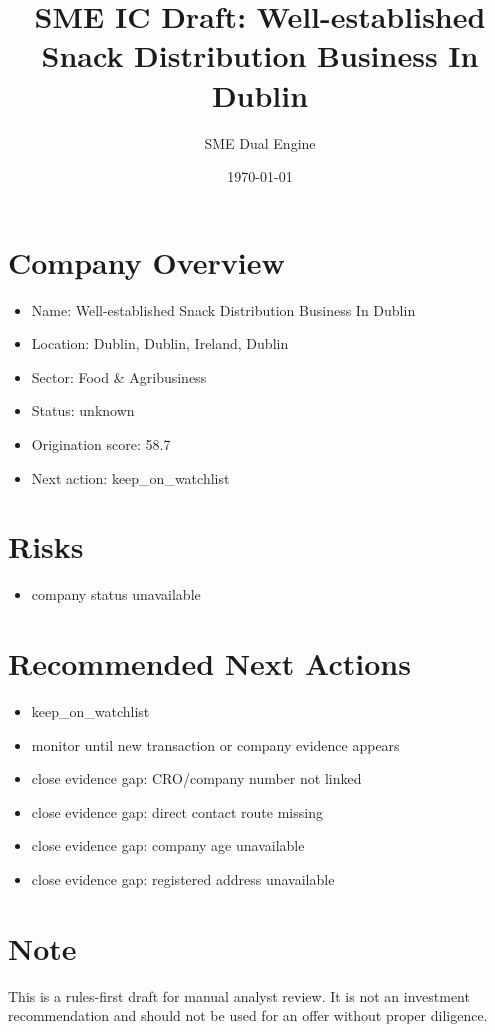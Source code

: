 \documentclass[11pt,a4paper]{article}
\title{SME IC Draft: Well-established Snack Distribution Business In Dublin}
\author{SME Dual Engine}
\date{\today}
\begin{document}
\maketitle
\section*{Company Overview}
\begin{itemize}[leftmargin=1.4em]
\item Name: Well-established Snack Distribution Business In Dublin
\item Location: Dublin, Dublin, Ireland, Dublin
\item Sector: Food \& Agribusiness
\item Status: unknown
\item Origination score: 58.7
\item Next action: keep\_on\_watchlist
\end{itemize}
\section*{Risks}
\begin{itemize}[leftmargin=1.4em]
\item company status unavailable
\end{itemize}
\section*{Recommended Next Actions}
\begin{itemize}[leftmargin=1.4em]
\item keep\_on\_watchlist
\item monitor until new transaction or company evidence appears
\item close evidence gap: CRO/company number not linked
\item close evidence gap: direct contact route missing
\item close evidence gap: company age unavailable
\item close evidence gap: registered address unavailable
\end{itemize}
\section*{Note}
This is a rules-first draft for manual analyst review. It is not an investment
recommendation and should not be used for an offer without proper diligence.
\end{document}
